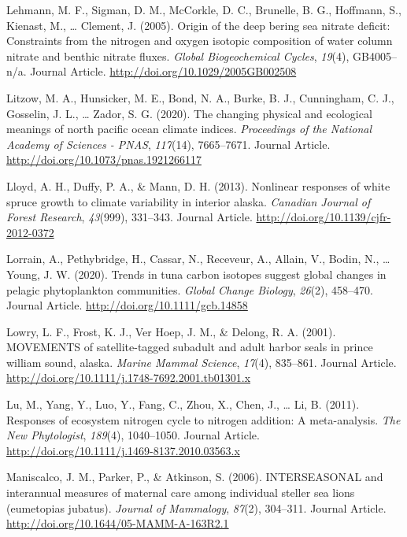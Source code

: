 \documentclass [11pt, proquest] {uwthesis}[2015/03/03]
\begin{document}
\hypertarget{ref-Lehmann2005}{}
Lehmann, M. F., Sigman, D. M., McCorkle, D. C., Brunelle, B. G.,
Hoffmann, S., Kienast, M., \ldots{} Clement, J. (2005). Origin of the
deep bering sea nitrate deficit: Constraints from the nitrogen and
oxygen isotopic composition of water column nitrate and benthic nitrate
fluxes. \emph{Global Biogeochemical Cycles}, \emph{19}(4), GB4005--n/a.
Journal Article. \url{http://doi.org/10.1029/2005GB002508}

\hypertarget{ref-Litzow2020}{}
Litzow, M. A., Hunsicker, M. E., Bond, N. A., Burke, B. J., Cunningham,
C. J., Gosselin, J. L., \ldots{} Zador, S. G. (2020). The changing
physical and ecological meanings of north pacific ocean climate indices.
\emph{Proceedings of the National Academy of Sciences - PNAS},
\emph{117}(14), 7665--7671. Journal Article.
\url{http://doi.org/10.1073/pnas.1921266117}

\hypertarget{ref-Lloyd2013}{}
Lloyd, A. H., Duffy, P. A., \& Mann, D. H. (2013). Nonlinear responses
of white spruce growth to climate variability in interior alaska.
\emph{Canadian Journal of Forest Research}, \emph{43}(999), 331--343.
Journal Article. \url{http://doi.org/10.1139/cjfr-2012-0372}

\hypertarget{ref-Lorrain2020}{}
Lorrain, A., Pethybridge, H., Cassar, N., Receveur, A., Allain, V.,
Bodin, N., \ldots{} Young, J. W. (2020). Trends in tuna carbon isotopes
suggest global changes in pelagic phytoplankton communities.
\emph{Global Change Biology}, \emph{26}(2), 458--470. Journal Article.
\url{http://doi.org/10.1111/gcb.14858}

\hypertarget{ref-Lowry2001}{}
Lowry, L. F., Frost, K. J., Ver Hoep, J. M., \& Delong, R. A. (2001).
MOVEMENTS of satellite-tagged subadult and adult harbor seals in prince
william sound, alaska. \emph{Marine Mammal Science}, \emph{17}(4),
835--861. Journal Article.
\url{http://doi.org/10.1111/j.1748-7692.2001.tb01301.x}

\hypertarget{ref-Lu2011}{}
Lu, M., Yang, Y., Luo, Y., Fang, C., Zhou, X., Chen, J., \ldots{} Li, B.
(2011). Responses of ecosystem nitrogen cycle to nitrogen addition: A
meta-analysis. \emph{The New Phytologist}, \emph{189}(4), 1040--1050.
Journal Article. \url{http://doi.org/10.1111/j.1469-8137.2010.03563.x}

\hypertarget{ref-Maniscalco2006}{}
Maniscalco, J. M., Parker, P., \& Atkinson, S. (2006). INTERSEASONAL and
interannual measures of maternal care among individual steller sea lions
(eumetopias jubatus). \emph{Journal of Mammalogy}, \emph{87}(2),
304--311. Journal Article.
\url{http://doi.org/10.1644/05-MAMM-A-163R2.1}
\end{document}
